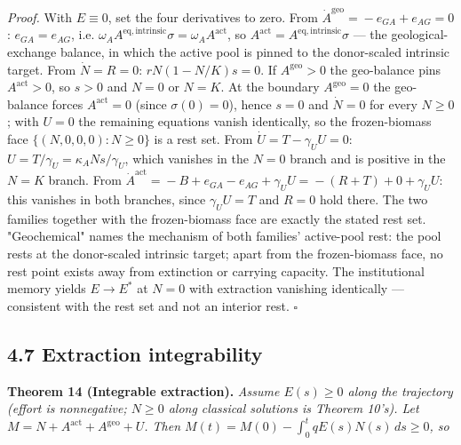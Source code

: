 \documentclass[11pt]{article}
\begin{document}
\emph{Proof.} With \(E \equiv 0\), set the four derivatives to zero. From \(\dot A^{\mathrm{geo}} =\allowbreak{} -e_{GA} +\allowbreak{} e_{AG} =\allowbreak{} 0\): \(e_{GA} = e_{AG}\), i.e. \(\omega_A A^{\mathrm{eq,\allowbreak{}intrinsic}} \sigma =\allowbreak{} \omega_A A^{\mathrm{act}}\), so \(A^{\mathrm{act}} =\allowbreak{} A^{\mathrm{eq,\allowbreak{}intrinsic}} \sigma\) --- the geological-exchange balance, in which the active pool is pinned to the donor-scaled intrinsic target. From \(\dot N = R = 0\): \(rN(1 - N/\allowbreak{}K)s = 0\). If \(A^{\mathrm{geo}} > 0\) the geo-balance pins \(A^{\mathrm{act}} > 0\), so \(s > 0\) and \(N = 0\) or \(N = K\). At the boundary \(A^{\mathrm{geo}} = 0\) the geo-balance forces \(A^{\mathrm{act}} = 0\) (since \(\sigma(0) = 0\)), hence \(s = 0\) and \(\dot N = 0\) for every \(N \ge 0\); with \(U = 0\) the remaining equations vanish identically, so the frozen-biomass face \(\{(N, 0, 0, 0) : N \ge 0\}\) is a rest set. From \(\dot U = T - \gamma_U U = 0\): \(U =\allowbreak{} T/\gamma_U =\allowbreak{} \kappa_A N s/\gamma_U\), which vanishes in the \(N = 0\) branch and is positive in the \(N = K\) branch. From \(\dot A^{\mathrm{act}} =\allowbreak{} -B +\allowbreak{} e_{GA} - e_{AG} +\allowbreak{} \gamma_U U =\allowbreak{} -(R +\allowbreak{} T) +\allowbreak{} 0 +\allowbreak{} \gamma_U U\): this vanishes in both branches, since \(\gamma_U U = T\) and \(R = 0\) hold there. The two families together with the frozen-biomass face are exactly the stated rest set. "Geochemical" names the mechanism of both families' active-pool rest: the pool rests at the donor-scaled intrinsic target; apart from the frozen-biomass face, no rest point exists away from extinction or carrying capacity. The institutional memory yields \(E \to E^*\) at \(N = 0\) with extraction vanishing identically --- consistent with the rest set and not an interior rest. \(\square\)

\subsection*{4.7 Extraction integrability}\label{47-extraction-integrability}

\textbf{Theorem 14 (Integrable extraction).} \emph{Assume \(E(s) \ge 0\) along the trajectory (effort is nonnegative; \(N \ge 0\) along classical solutions is Theorem 10's). Let \(M =\allowbreak{} N +\allowbreak{} A^{\mathrm{act}} +\allowbreak{} A^{\mathrm{geo}} +\allowbreak{} U\). Then \(M(t) =\allowbreak{} M(0) - \int_0^t qE(s)N(s)\,\allowbreak{} ds \ge 0\), so} 
\end{document}
